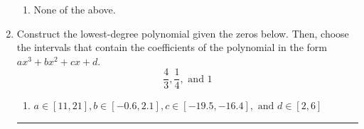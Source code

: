 \documentclass[14pt]{extbook}
\newcommand{\litem}[1]{\item#1\hspace*{-1cm}\rule{\textwidth}{0.4pt}}
\begin{document}
\begin{enumerate}
{\begin{enumerate}[label=\Alph*.]
\item None of the above.
\end{enumerate} }
\litem{
Construct the lowest-degree polynomial given the zeros below. Then, choose the intervals that contain the coefficients of the polynomial in the form $ax^3+bx^2+cx+d$.\[ \frac{4}{3}, \frac{1}{4}, \text{ and } 1 \]\begin{enumerate}[label=\Alph*.]
\item \( a \in [11, 21], b \in [-0.6, 2.1], c \in [-19.5, -16.4], \text{ and } d \in [2, 6] \)

\end{enumerate}}
\end{enumerate}
\end{document}
